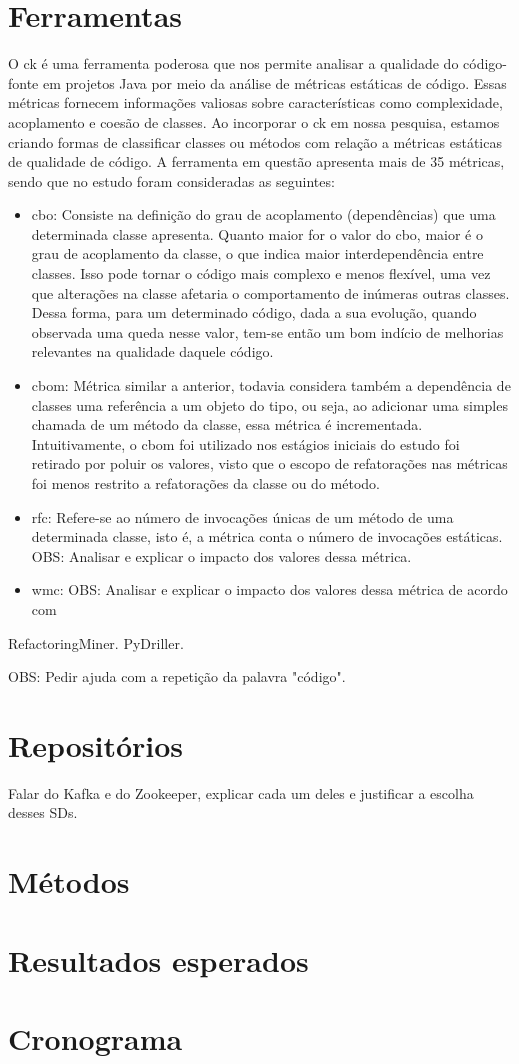 \section{Ferramentas}\label{sec:ferramentas}
O \gls{ck} é uma ferramenta poderosa que nos permite analisar a qualidade do código-fonte em projetos Java por meio da análise de métricas estáticas de código. Essas métricas fornecem informações valiosas sobre características como complexidade, acoplamento e coesão de classes. Ao incorporar o \gls{ck} em nossa pesquisa, estamos criando formas de classificar classes ou métodos com relação a métricas estáticas de qualidade de código. A ferramenta em questão apresenta mais de 35 métricas, sendo que no estudo foram consideradas as seguintes:
\begin{itemize}
    \item \gls{cbo}: Consiste na definição do grau de acoplamento (dependências) que uma determinada classe apresenta. Quanto maior for o valor do \gls{cbo}, maior é o grau de acoplamento da classe, o que indica maior interdependência entre classes. Isso pode tornar o código mais complexo e menos flexível, uma vez que alterações na classe afetaria o comportamento de inúmeras outras classes. Dessa forma, para um determinado código, dada a sua evolução, quando observada uma queda nesse valor, tem-se então um bom indício de melhorias relevantes na qualidade daquele código.
    \item \gls{cbom}: Métrica similar a anterior, todavia considera também a dependência de classes uma referência a um objeto do tipo, ou seja, ao adicionar uma simples chamada de um método da classe, essa métrica é incrementada. Intuitivamente, o \gls{cbom} foi utilizado nos estágios iniciais do estudo foi retirado por poluir os valores, visto que o escopo de refatorações nas métricas foi menos restrito a refatorações da classe ou do método.
    \item \gls{rfc}: Refere-se ao número de invocações únicas de um método de uma determinada classe, isto é, a métrica conta o número de invocações estáticas. 
    OBS: Analisar e explicar o impacto dos valores dessa métrica.
    \item \gls{wmc}: OBS: Analisar e explicar o impacto dos valores dessa métrica de acordo com \cite{MetricsSuite}
\end{itemize}

RefactoringMiner.
PyDriller.

OBS: Pedir ajuda com a repetição da palavra "código".

\section{Repositórios}\label{sec:repositorios}
Falar do Kafka e do Zookeeper, explicar cada um deles e justificar a escolha desses SDs.

\section{Métodos}\label{sec:metodo}

\section{Resultados esperados}


\section{Cronograma}